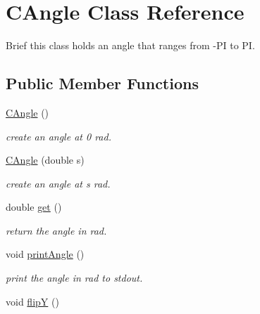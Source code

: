 \hypertarget{class_c_angle}{
\section{CAngle Class Reference}
\label{class_c_angle}
}


Brief this class holds an angle that ranges from -\/PI to PI.  


\subsection*{Public Member Functions}
\begin{DoxyCompactItemize}
\item 
\hypertarget{class_c_angle_aa47bc939ce401caa4b7b04153737d4ad}{
\hyperlink{class_c_angle_aa47bc939ce401caa4b7b04153737d4ad}{CAngle} ()}
\label{class_c_angle_aa47bc939ce401caa4b7b04153737d4ad}

\begin{DoxyCompactList}\small\item\em create an angle at 0 rad. \item\end{DoxyCompactList}\item 
\hypertarget{class_c_angle_ad1dd62cee0f725de2fa756530cd4f796}{
\hyperlink{class_c_angle_ad1dd62cee0f725de2fa756530cd4f796}{CAngle} (double s)}
\label{class_c_angle_ad1dd62cee0f725de2fa756530cd4f796}

\begin{DoxyCompactList}\small\item\em create an angle at s rad. \item\end{DoxyCompactList}\item 
\hypertarget{class_c_angle_a0f561013ffb3ed3c7fcf914a91dad5c2}{
double \hyperlink{class_c_angle_a0f561013ffb3ed3c7fcf914a91dad5c2}{get} ()}
\label{class_c_angle_a0f561013ffb3ed3c7fcf914a91dad5c2}

\begin{DoxyCompactList}\small\item\em return the angle in rad. \item\end{DoxyCompactList}\item 
\hypertarget{class_c_angle_a76a13932b26497bb8358c4a3099414a3}{
void \hyperlink{class_c_angle_a76a13932b26497bb8358c4a3099414a3}{printAngle} ()}
\label{class_c_angle_a76a13932b26497bb8358c4a3099414a3}

\begin{DoxyCompactList}\small\item\em print the angle in rad to stdout. \item\end{DoxyCompactList}\item 
\hypertarget{class_c_angle_a1622eec4876dcd1e6846caae61b1eaa6}{
void \hyperlink{class_c_angle_a1622eec4876dcd1e6846caae61b1eaa6}{flipY} ()}
\label{class_c_angle_a1622eec4876dcd1e6846caae61b1eaa6}


\end{DoxyCompactItemize}
